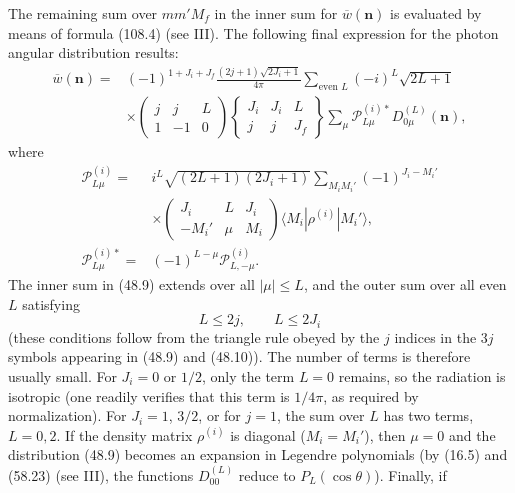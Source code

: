 The remaining sum over $mm'M_f$ in the inner sum for $\overline w(\mathbf n)$ is evaluated by means of formula (108.4) (see III). The following final expression for the photon angular distribution results:
\begin{equation}
\begin{split}
\overline w(\mathbf n)={}&(-1)^{1+J_i+J_f}
\frac{(2j+1)\sqrt{2J_i+1}}{4\pi}
\sum_{\text{even }L}(-i)^L\sqrt{2L+1}\\
&\times\begin{pmatrix}j&j&L\\1&-1&0\end{pmatrix}
\left\{\begin{matrix}J_i&J_i&L\\j&j&J_f\end{matrix}\right\}
\sum_\mu\mathcal P_{L\mu}^{(i)*}D_{0\mu}^{(L)}(\mathbf n),
\end{split}
\tag{48.9}
\end{equation}
where
\begin{equation}
\begin{split}
\mathcal P_{L\mu}^{(i)}={}&i^L\sqrt{(2L+1)(2J_i+1)}
\sum_{M_iM_i'}(-1)^{J_i-M_i'}\\
&\times\begin{pmatrix}J_i&L&J_i\\-M_i'&\mu&M_i\end{pmatrix}
\langle M_i|\rho^{(i)}|M_i'\rangle,\\
\mathcal P_{L\mu}^{(i)*}={}&(-1)^{L-\mu}\mathcal P_{L,-\mu}^{(i)}.
\end{split}
\tag{48.10}
\end{equation}
The inner sum in (48.9) extends over all $|\mu|\leq L$, and the outer sum over all even $L$ satisfying
\begin{equation}
L\leq2j,\qquad L\leq2J_i
\tag{48.11}
\end{equation}
(these conditions follow from the triangle rule obeyed by the $j$ indices in the $3j$ symbols appearing in (48.9) and (48.10)). The number of terms is therefore usually small. For $J_i=0$ or $1/2$, only the term $L=0$ remains, so the radiation is isotropic (one readily verifies that this term is $1/4\pi$, as required by normalization). For $J_i=1$, $3/2$, or for $j=1$, the sum over $L$ has two terms, $L=0,2$. If the density matrix $\rho^{(i)}$ is diagonal ($M_i=M_i'$), then $\mu=0$ and the distribution (48.9) becomes an expansion in Legendre polynomials (by (16.5) and (58.23) (see III), the functions $D_{00}^{(L)}$ reduce to $P_L(\cos\theta)$). Finally, if
